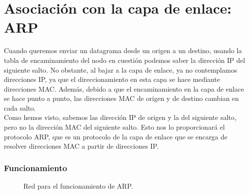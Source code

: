 \section{Asociación con la capa de enlace: \acrfull{ARP}}
Cuando queremos enviar un datagrama desde un origen a un destino, usando la tabla de encaminamiento del nodo en cuestión podemos saber la dirección IP del siguiente salto. No obstante, al bajar a la capa de enlace, ya no contemplamos direcciones IP\@, ya que el direccionamiento en esta capa se hace mediante direcciones \acrshort{MAC}. Además, debido a que el encaminamiento en la capa de enlace se hace punto a punto, las direcciones \acrshort{MAC} de origen y de destino cambian en cada salto.\\

Como hemos visto, sabemos las dirección IP de origen y la del siguiente salto, pero no la dirección \acrshort{MAC} del siguiente salto. Esto nos lo proporcionará el protocolo \acrshort{ARP}, que es un protocolo de la capa de enlace que se encarga de resolver direcciones \acrshort{MAC} a partir de direcciones IP\@.

\subsubsection{Funcionamiento}

\begin{figure}
    \centering
    \caption{Red para el funcionamiento de \acrshort{ARP}.}
    \label{fig:arp}
\end{figure}

